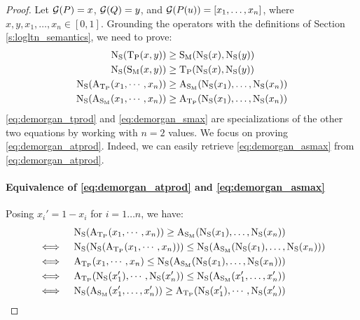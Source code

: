 \begin{proof}
    Let $\G(P) = x$, $\G(Q) = y$, and $\G(P(u)) = [x_1, \dots, x_n]$, where $x, y, x_1, \dots, x_n \in [0,1]$.
    Grounding the operators with the definitions of Section \ref{s:logltn_semantics}, we need to prove:
    \begin{align}
        \Ns(\Tprod(x,y)) &\geq \Smax(\Ns(x),\Ns(y)) \label{eq:demorgan_tprod}\\
        \Ns(\Smax(x,y)) &\geq \Tprod(\Ns(x),\Ns(y)) \label{eq:demorgan_smax}\\
        \Ns(\Atprod(x_1,\cdots,x_n)) &\geq \Asmax(\Ns(x_1),\dots,\Ns(x_n)) \label{eq:demorgan_atprod}\\
        \Ns(\Asmax(x_1,\cdots,x_n)) &\geq \Atprod(\Ns(x_1),\dots,\Ns(x_n)) \label{eq:demorgan_asmax}
    \end{align}
    \eqref{eq:demorgan_tprod} and \eqref{eq:demorgan_smax} are specializations of the other two equations by working with $n=2$ values.
    We focus on proving \eqref{eq:demorgan_atprod}.
    Indeed, we can easily retrieve \eqref{eq:demorgan_asmax} from \eqref{eq:demorgan_atprod}.
    \paragraph{Equivalence of \eqref{eq:demorgan_atprod} and \eqref{eq:demorgan_asmax}}
    Posing $x_i'=1-x_i$ for $i=1\dots n$, we have:
    \begin{align}
        & \quad \Ns(\Atprod(x_1,\cdots,x_n)) \geq \Asmax(\Ns(x_1),\dots,\Ns(x_n))\\
        \iff & \quad \Ns(\Ns(\Atprod(x_1,\cdots,x_n))) \leq \Ns(\Asmax(\Ns(x_1),\dots,\Ns(x_n))) \\
        \iff & \quad \Atprod(x_1,\cdots,x_n) \leq \Ns(\Asmax(\Ns(x_1),\dots,\Ns(x_n))) \\
        \iff & \quad \Atprod(\Ns(x_1'),\cdots,\Ns(x_n')) \leq \Ns(\Asmax(x_1',\dots,x_n'))\\
        \iff & \quad \Ns(\Asmax(x_1',\dots,x_n')) \geq \Atprod(\Ns(x_1'),\cdots,\Ns(x_n'))
    \end{align}


\end{proof}
